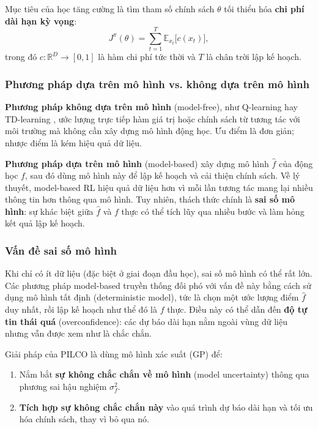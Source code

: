 Mục tiêu của học tăng cường là tìm tham số chính sách $\theta$ tối thiểu hóa \textbf{chi phí dài hạn kỳ vọng}:
\begin{equation}
    J^\pi(\theta) = \sum_{t=1}^{T} \mathbb{E}_{x_t}\bigl[c(x_t)\bigr],
    \label{chi_phi_dai_han}
\end{equation}
trong đó $c: \mathbb{R}^D \to [0, 1]$ là hàm chi phí tức thời và $T$ là chân trời lập kế hoạch.

\subsubsection{Phương pháp dựa trên mô hình vs. không dựa trên mô hình}
\label{SUB_SUB_SEC_model_based_vs_free}

\textbf{Phương pháp không dựa trên mô hình} (model-free), như Q-learning \cite{Watkins_1989} hay TD-learning \cite{Sutton_Barto_1998}, ước lượng trực tiếp hàm giá trị hoặc chính sách từ tương tác với môi trường mà không cần xây dựng mô hình động học. Ưu điểm là đơn giản; nhược điểm là kém hiệu quả dữ liệu.

\textbf{Phương pháp dựa trên mô hình} (model-based) xây dựng mô hình $\hat{f}$ của động học $f$, sau đó dùng mô hình này để lập kế hoạch và cải thiện chính sách. Về lý thuyết, model-based RL hiệu quả dữ liệu hơn vì mỗi lần tương tác mang lại nhiều thông tin hơn thông qua mô hình. Tuy nhiên, thách thức chính là \textbf{sai số mô hình}: sự khác biệt giữa $\hat{f}$ và $f$ thực có thể tích lũy qua nhiều bước và làm hỏng kết quả lập kế hoạch.
\medskip

\subsubsection{Vấn đề sai số mô hình}
\label{SUB_SUB_SEC_model_error}

Khi chỉ có ít dữ liệu (đặc biệt ở giai đoạn đầu học), sai số mô hình có thể rất lớn. Các phương pháp model-based truyền thống đối phó với vấn đề này bằng cách sử dụng mô hình tất định (deterministic model), tức là chọn một ước lượng điểm $\hat{f}$ duy nhất, rồi lập kế hoạch như thể đó là $f$ thực. Điều này có thể dẫn đến \textbf{độ tự tin thái quá} (overconfidence): các dự báo dài hạn nằm ngoài vùng dữ liệu nhưng vẫn được xem như là chắc chắn.
\medskip

Giải pháp của PILCO là dùng mô hình xác suất (GP) để:
\begin{enumerate}
    \item Nắm bắt \textbf{sự không chắc chắn về mô hình} (model uncertainty) thông qua phương sai hậu nghiệm $\sigma^2_f$.
    \item \textbf{Tích hợp sự không chắc chắn này} vào quá trình dự báo dài hạn và tối ưu hóa chính sách, thay vì bỏ qua nó.
\end{enumerate}

